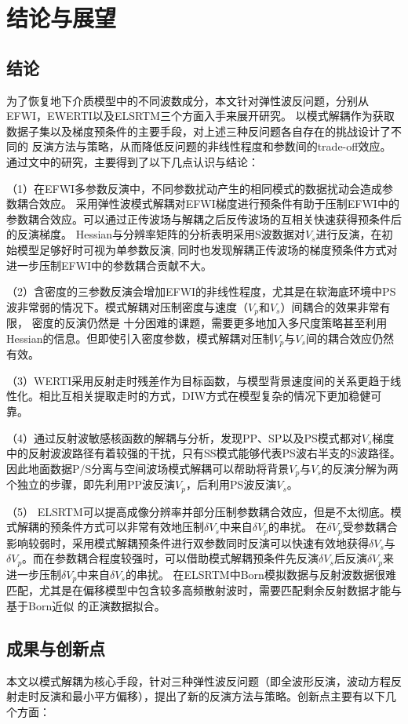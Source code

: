 \chapter{结论与展望}
\section{结论}
为了恢复地下介质模型中的不同波数成分，本文针对弹性波反问题，分别从EFWI，EWERTI以及ELSRTM三个方面入手来展开研究。
以模式解耦作为获取数据子集以及梯度预条件的主要手段，对上述三种反问题各自存在的挑战设计了不同的
反演方法与策略，从而降低反问题的非线性程度和参数间的trade-off效应。通过文中的研究，主要得到了以下几点认识与结论：

（1）在EFWI多参数反演中，不同参数扰动产生的相同模式的数据扰动会造成参数耦合效应。
采用弹性波模式解耦对EFWI梯度进行预条件有助于压制EFWI中的参数耦合效应。可以通过正传波场与解耦之后反传波场的互相关快速获得预条件后的反演梯度。
Hessian与分辨率矩阵的分析表明采用S波数据对$V_s$进行反演，在初始模型足够好时可视为单参数反演,
同时也发现解耦正传波场的梯度预条件方式对进一步压制EFWI中的参数耦合贡献不大。

（2）含密度的三参数反演会增加EFWI的非线性程度，尤其是在软海底环境中PS波非常弱的情况下。模式解耦对压制密度与速度（$V_p$和$V_s$）间耦合的效果非常有限，
密度的反演仍然是
十分困难的课题，需要更多地加入多尺度策略甚至利用Hessian的信息。但即使引入密度参数，模式解耦对压制$V_p$与$V_s$间的耦合效应仍然有效。

（3）WERTI采用反射走时残差作为目标函数，与模型背景速度间的关系更趋于线性化。相比互相关提取走时的方式，DIW方式在模型复杂的情况下更加稳健可靠。

（4）通过反射波敏感核函数的解耦与分析，发现PP、SP以及PS模式都对$V_s$梯度中的反射波波路径有着较强的干扰，只有SS模式能够代表PS波右半支的S波路径。
因此地面数据P/S分离与空间波场模式解耦可以帮助将背景$V_p$与$V_s$的反演分解为两个独立的步骤，即先利用PP波反演$V_p$，后利用PS波反演$V_s$。

（5）
ELSRTM可以提高成像分辨率并部分压制参数耦合效应，但是不太彻底。模式解耦的预条件方式可以非常有效地压制$\delta
V_s$中来自$\delta V_p$的串扰。
在$\delta V_p$受参数耦合影响较弱时，采用模式解耦预条件进行双参数同时反演可以快速有效地获得$\delta
V_s$与$\delta V_p$。而在参数耦合程度较强时，可以借助模式解耦预条件先反演$\delta V_s$后反演$\delta
V_p$来进一步压制$\delta V_p$中来自$\delta V_s$的串扰。
在ELSRTM中Born模拟数据与反射波数据很难匹配，尤其是在偏移模型中包含较多高频散射波时，需要匹配剩余反射数据才能与基于Born近似
的正演数据拟合。
\section{成果与创新点}
本文以模式解耦为核心手段，针对三种弹性波反问题（即全波形反演，波动方程反射走时反演和最小平方偏移），提出了新的反演方法与策略。创新点主要有以下几个方面：

